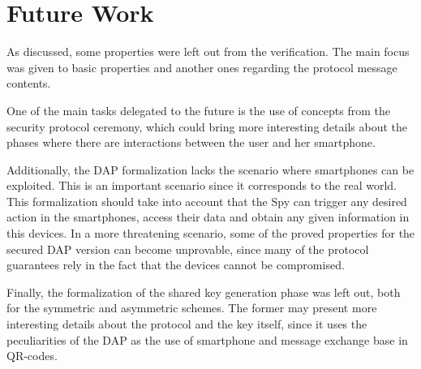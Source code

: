 \section{Future Work}
As discussed, some properties were left out from the verification. The main focus was given to basic properties and another ones regarding the protocol message contents.

One of the main tasks delegated to the future is the use of concepts from the security protocol ceremony, which could bring more interesting details about the phases where there are interactions between the user and her smartphone.

Additionally, the DAP formalization lacks the scenario where smartphones can be exploited. This is an important scenario since it corresponds to the real world. This formalization should take into account that the Spy can trigger any desired action in the smartphones, access their data and obtain any given information in this devices. In a more threatening scenario, some of the proved properties for the secured DAP version can become unprovable, since many of the protocol guarantees rely in the fact that the devices cannot be compromised.

Finally, the formalization of the shared key generation phase was left out, both for the symmetric and asymmetric schemes. The former may present more interesting details about the protocol and the key itself, since it uses the peculiarities of the DAP as the use of smartphone and message exchange base in QR-codes.
